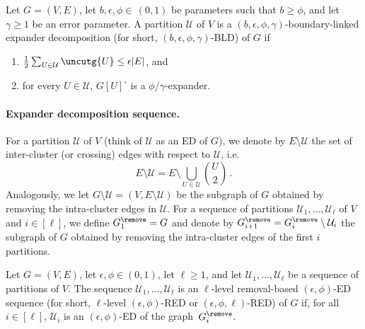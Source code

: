 \begin{definition}
	\label{def:expdec}
	Let $G=(V,E)$, let $b, \epsilon, \phi \in \, (0,1)$ be parameters such that $b \ge \phi$, and let $\gamma \ge 1$ be an error parameter. A partition $\mathcal{U}$ of $V$ is a $(b, \epsilon, \phi, \gamma)$-boundary-linked expander decomposition (for short, $(b, \epsilon, \phi, \gamma)$-BLD) of $G$ if
	\begin{enumerate}
		\item \label{property:crossing} $\frac{1}{2}\sum_{U \in \mathcal{U}} \uncutg{U} \le \epsilon |E|$, and
		\item \label{property:expander} for every $U \in \mathcal{U}$, $G[U]^{\circ}$ is a $ \phi/\gamma$-expander.
	\end{enumerate}
\end{definition}

\paragraph{Expander decomposition sequence.} For a partition $\mathcal{U}$ of $V$ (think of $\mathcal{U}$ as an ED of $G$), we denote by $E \setminus \mathcal{U}$ the set of inter-cluster (or crossing) edges with respect to $\mathcal{U}$, i.e.
\begin{equation*}
	E \setminus \mathcal{U} = E \setminus \bigcup_{U \in \mathcal{U}} \binom{U}{2} \, .
\end{equation*}
Analogously, we let $G\setminus \mathcal{U} = (V,E\setminus \mathcal{U})$ be the subgraph of $G$ obtained by removing the intra-cluster edges in $\mathcal{U}$.  For a sequence of partitions $\mathcal{U}_1, \dots, \mathcal{U}_\ell$ of $V$ and $i \in [\ell]$, we define $G^{\remove}_1=G$ and denote by $G^{\remove}_{i+1} = G^{\remove}_{i} \setminus \mathcal{U}_i$ the subgraph of $G$ obtained by removing the intra-cluster edges of the first $i$ partitions.

\begin{definition}
	\label{def:expdecrec}
	Let $G=(V,E)$, let $\epsilon, \phi \in (0,1)$, let $\ell \ge 1$, and let $\mathcal{U}_1, \dots, \mathcal{U}_\ell$ be a sequence of partitions of $V$. The sequence $\mathcal{U}_1, \dots, \mathcal{U}_\ell$ is an $\ell$-level removal-based $(\epsilon, \phi)$-ED sequence (for short, $\ell$-level $(\epsilon, \phi)$-RED or $(\epsilon,\phi,\ell)$-RED) of $G$ if, for all $i \in [\ell]$, $\mathcal{U}_i$ is an $(\epsilon, \phi)$-ED of the graph~$G^{\remove}_i$.
\end{definition}



